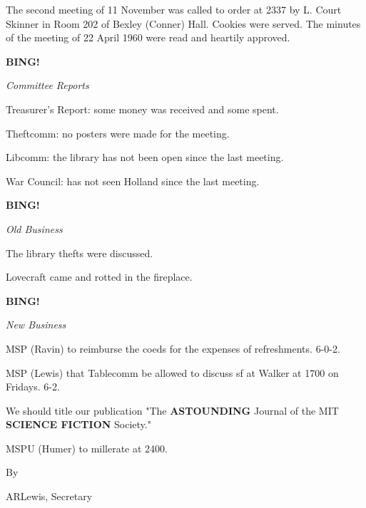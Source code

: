 \documentclass[12pt]{article}
\newcommand{\bing}{{\bf BING!} }
\newcommand{\goto}[1]{\bing \vskip 12pt \centerline{{\em{#1}}}}
\begin{document}
\vspace{12pt}

\setlength{\parskip}{6pt}

\noindent
The second meeting of 11 November was called to order at 2337 by L. Court Skinner in Room 202 of Bexley (Conner) Hall. Cookies were served. The minutes of the meeting of 22 April 1960 were read and heartily approved.

\goto{Committee Reports}

Treasurer's Report: some money was received and some spent.

Theftcomm: no posters were made for the meeting.

Libcomm: the library has not been open since the last meeting.

War Council: has not seen Holland since the last meeting.

\goto{Old Business}

The library thefts were discussed.

Lovecraft came and rotted in the fireplace.

\goto{New Business}

MSP (Ravin) to reimburse the coeds for the expenses of refreshments. 6-0-2.

MSP (Lewis) that Tablecomm be allowed to discuss sf at Walker at 1700 on Fridays. 6-2.

We should title our publication "The {\bf ASTOUNDING} Journal of the MIT {\bf SCIENCE FICTION} Society."

MSPU (Humer) to millerate at 2400.

\vspace{12pt}

\centerline{By}
\centerline{ARLewis, Secretary}
\end{document}
